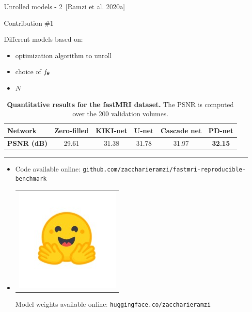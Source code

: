\begin{frame}{Unrolled models - 2~[Ramzi et al. 2020a]}
    \begin{exampleblock}{Contribution \#1}
    \end{exampleblock}
    Different models based on:
    \begin{itemize}
        \item optimization algorithm to unroll
        \item choice of $f_{{\boldsymbol{\theta}}}$
        \item $N$
    \end{itemize}

    \begin{overprint}
    \vspace{-1em}
        \begin{table}[h]
            \centering
            \caption{\textbf{Quantitative results for the fastMRI dataset.} The PSNR is computed over the 200 validation volumes.}
            \label{tab:quanti-fastmri}
            \vspace{-0.5em}
            \begin{tabular}{l|c|c|c|c|c}
            \textbf{Network} & \textbf{Zero-filled} & \textbf{KIKI-net} & \textbf{U-net} & \textbf{Cascade net} & \textbf{PD-net}\footnotemark \\ \hline
            \textbf{PSNR (dB)} & 29.61 & 31.38 & 31.78 & 31.97 & \textbf{32.15}
            \end{tabular}%
            \end{table}




    \noindent\rule{\textwidth}{1pt}

        \begin{itemize}
            \item {} Code available online: \texttt{github.com/zaccharieramzi/fastmri-reproducible-benchmark}
            \item\begin{tabular}{@{}c@{}}\includegraphics[width=3ex]{Figures/hf_logo.jpeg}\end{tabular}Model weights available online: \texttt{huggingface.co/zaccharieramzi}
        \end{itemize}
    \end{overprint}

\end{frame}


